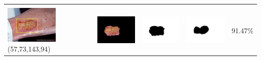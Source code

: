 \begin{table}[H]
\begin{tabular}{|m{1.0in}|m{1.0in}|m{1.0in}|m{1.0in}|m{0.6in}|}
		
		&  &  & \\
		\includegraphics[width=1.0in]{gambar/hasil_segmentasi/luka_kuning/image_3_rect.jpg} {\centering\fontsize{10}{10}\selectfont(57,73,143,94)}&
		\includegraphics[width=1.0in]{gambar/hasil_segmentasi/luka_kuning/result_3.jpg}&
		\includegraphics[width=1.0in]{gambar/hasil_segmentasi/luka_kuning/mask_r_3.jpg}&
		\includegraphics[width=1.0in]{gambar/hasil_segmentasi/luka_kuning/3_r.jpg}&
		91.47\% \\
		\hline

	\end{tabular}
\end{table}

